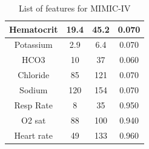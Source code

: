 \begin{table}[!ht]
\begin{tabular}{|c|c|c|c|}
 Hematocrit& 19.4& 45.2&0.070\\ \hline 
 Potassium& 2.9& 6.4&0.070\\ \hline 
 HCO3& 10& 37&0.060\\ \hline 
 Chloride& 85& 121&0.070\\ \hline 
 Sodium& 120& 154&0.070\\ \hline 
 Resp Rate& 8& 35&0.950\\ \hline 
 O2 sat& 88& 100&0.940\\ \hline 
 Heart rate& 49& 133&0.960\\ \hline
    \end{tabular}
    \caption{List of features for MIMIC-IV}
    \label{tab:mimic_features}
\end{table}